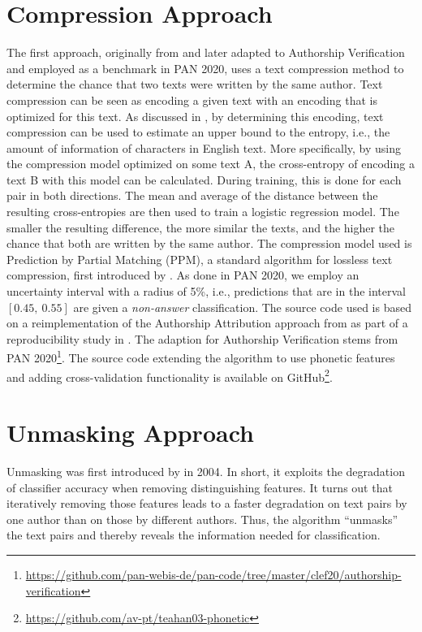 \section{Compression Approach}\label{sec:compression-approach}
The first approach, originally from \cite{teahan2003compression} and later adapted to Authorship Verification and employed as a benchmark in PAN 2020, uses a text compression method to determine the chance that two texts were written by the same author.
Text compression can be seen as encoding a given text with an encoding that is optimized for this text.
As discussed in \cite{brown1992upperBoundEntropy}, by determining this encoding, text compression can be used to estimate an upper bound to the entropy, i.e., the amount of information of characters in English text.
More specifically, by using the compression model optimized on some text A, the cross-entropy of encoding a text B with this model can be calculated.
During training, this is done for each pair in both directions.
The mean and average of the distance between the resulting cross-entropies are then used to train a logistic regression model.
The smaller the resulting difference, the more similar the texts, and the higher the chance that both are written by the same author.
The compression model used is Prediction by Partial Matching (PPM), a standard algorithm for lossless text compression, first introduced by \cite{cleary1984PPM}.
As done in PAN 2020, we employ an uncertainty interval with a radius of 5\%, i.e., predictions that are in the interval $[0.45,~0.55]$ are given a \textit{non-answer} classification.
The source code used is based on a reimplementation of the Authorship Attribution approach from \cite{teahan2003compression} as part of a reproducibility study in \cite{potthast2016reimplementation}.
The adaption for Authorship Verification stems from PAN 2020\footnote{\url{https://github.com/pan-webis-de/pan-code/tree/master/clef20/authorship-verification}}.
The source code extending the algorithm to use phonetic features and adding cross-validation functionality is available on GitHub\footnote{\url{https://github.com/av-pt/teahan03-phonetic}}.

\section{Unmasking Approach}\label{sec:unmasking-approach}
Unmasking was first introduced by \citeauthor{koppel2004unmasking} in 2004.
In short, it exploits the degradation of classifier accuracy when removing distinguishing features.
It turns out that iteratively removing those features leads to a faster degradation on text pairs by one author than on those by different authors.
Thus, the algorithm ``unmasks'' the text pairs and thereby reveals the information needed for classification.

